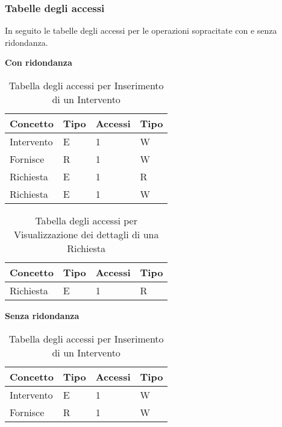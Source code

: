 \documentclass{article}
\begin{document}
\subsubsection{Tabelle degli accessi }
In seguito le tabelle degli accessi per le operazioni sopracitate con e senza ridondanza.

\textbf{Con ridondanza}

\begin{table}[h]
    \centering
    \begin{adjustbox}{width=0.6\textwidth}
        \begin{tabular}{|m{2cm}|m{2cm}|m{2cm}|m{2cm}|}
            \hline  
            \textbf{Concetto} & \textbf{Tipo} & \textbf{Accessi} & \textbf{Tipo}\\ 
            \hline
            Intervento & E & 1 & W\\
            \hline
            Fornisce & R & 1 & W\\
            \hline
            Richiesta & E & 1 & R\\
            \hline
            Richiesta & E & 1 & W\\
            \hline            
        \end{tabular}
    \end{adjustbox}
    \caption{Tabella degli accessi per Inserimento di un Intervento}
    \label{tab:accesstable5}
\end{table}

\begin{table}[h]
    \centering
    \begin{adjustbox}{width=0.6\textwidth}
        \begin{tabular}{|m{2cm}|m{2cm}|m{2cm}|m{2cm}|}
            \hline  
            \textbf{Concetto} & \textbf{Tipo} & \textbf{Accessi} & \textbf{Tipo}\\ 
            \hline
            Richiesta & E & 1 & R\\
            \hline            
        \end{tabular}
    \end{adjustbox}
    \caption{Tabella degli accessi per Visualizzazione dei dettagli di una Richiesta}
    \label{tab:accesstable6}
\end{table}

\textbf{Senza ridondanza}

\begin{table}[h]
    \centering
    \begin{adjustbox}{width=0.6\textwidth}
        \begin{tabular}{|m{2cm}|m{2cm}|m{2cm}|m{2cm}|}
            \hline  
            \textbf{Concetto} & \textbf{Tipo} & \textbf{Accessi} & \textbf{Tipo}\\ 
            \hline
            Intervento & E & 1 & W\\
            \hline
            Fornisce & R & 1 & W\\
            \hline
        \end{tabular}
    \end{adjustbox}
    \caption{Tabella degli accessi per Inserimento di un Intervento}
    \label{tab:accesstable7}
\end{table}
\end{document}
